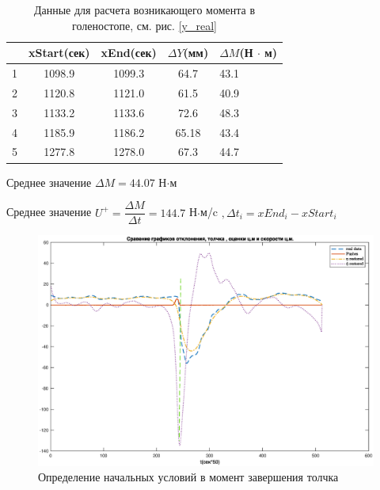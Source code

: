 \documentclass[a4paper,12pt, openany]{book}
\theoremstyle{plain} %
\theoremstyle{definition} %
\theoremstyle{remark} %
\numberwithin{equation}{chapter}
\begin{document}
{\begin{table}[h!]
    \centering
    \begin{tabular}{@{}|l|c|c|c|l|@{}}
        \toprule
          & \multicolumn{1}{l|}{xStart(сек)} & \multicolumn{1}{l|}{xEnd(сек)} & \multicolumn{1}{l|}{$\Delta Y$(мм)} & \multicolumn{1}{l|}{$\Delta M $(Н $\cdot$ м)} \\ \midrule
        1 & 1098.9                           & 1099.3                         & 64.7                                & 43.1                                          \\ \midrule
        2 & 1120.8                           & 1121.0                         & 61.5                                & 40.9                                          \\ \midrule
        3 & 1133.2                           & 1133.6                         & 72.6                                & 48.3                                          \\ \midrule
        4 & 1185.9                           & 1186.2                         & 65.18                               & 43.4                                          \\ \midrule
        5 & 1277.8                           & 1278.0                         & 67.3                                & 44.7                                          \\ \bottomrule
    \end{tabular}
    \caption{Данные для расчета возникающего момента в голеностопе, см. рис. \ref{y_real} }
    \label{moments_calculating}
\end{table}

Среднее значение $\Delta M=44.07$ Н$\cdot$м

Среднее значение $U^+=\dfrac{\Delta M}{\Delta t}=144.7$ Н$\cdot$м/c $,\Delta t_i=xEnd_i-xStart_i$
\begin{figure}[h!]
    \centering
    \includegraphics[width=0.65\linewidth]{all_real.eps}
    \caption{Определение начальных условий в момент завершения толчка}
    \label{all_real}
\end{figure}

}
\end{document}
